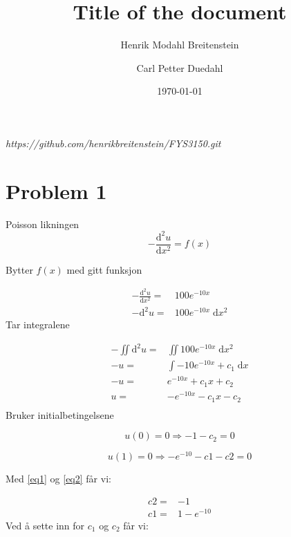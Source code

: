 \documentclass[english,notitlepage]{revtex4-1}  %
\begin{document}
\title{Title of the document}      %
\author{Henrik Modahl Breitenstein}          %
\author{Carl Petter Duedahl}
\date{\today}                             %
\noaffiliation                            %


\maketitle 

\begin{center}
	\textit{https://github.com/henrikbreitenstein/FYS3150.git}
\end{center}    

\section*{Problem 1}

Poisson likningen
$$- \frac{\mathrm{d}^2 u}{\mathrm{d}x^2} = f(x)$$

Bytter $f(x)$ med gitt funksjon

\begin{align*}
- \frac{\mathrm{d}^2 u}{\mathrm{d}x^2} =& 100e^{-10x} \\
-\mathrm{d}^2 u =& 100e^{-10x} \; \mathrm{d}x^2
\end{align*}
Tar integralene

\begin{align*}
-\iint \mathrm{d}^2 u =& \iint 100e^{-10x} \; \mathrm{d}x^2 \\
-u =& \int -10e^{-10x} + c_1 \; \mathrm{d} x \\
-u =& e^{-10x} + c_1x + c_2 \\
u =& -e^{-10x} - c_1x - c_2 \\
\end{align*}
Bruker initialbetingelsene


\begin{equation}\label{eq1}
u(0) = 0 \Rightarrow - 1 - c_2 = 0
\end{equation}


\begin{equation}\label{eq2}
u(1) = 0 \Rightarrow -e^{-10} -c1 -c2 = 0
\end{equation}

Med \ref{eq1} og \ref{eq2} får vi:

\begin{align*}
c2 =& -1 \\
c1 =& 1 - e^{-10}
\end{align*}
Ved å sette inn for $c_1$ og $c_2$ får vi:
\end{document}
